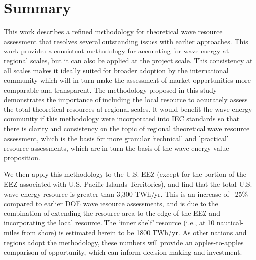 \section{Summary}
\label{sec:conclusion}

This work describes a refined methodology for theoretical wave resource assessment that resolves several outstanding issues with earlier approaches. This work provides a consistent methodology for accounting for wave energy at regional scales, but it can also be applied at the project scale. This consistency at all scales makes it ideally suited for broader adoption by the international community which will in turn make the assessment of market opportunities more comparable and transparent. The methodology proposed in this study demonstrates the importance of including the local resource to accurately assess the total theoretical resources at regional scales. It would benefit the wave energy community if this methodology were incorporated into IEC standards so that there is clarity and consistency on the topic of regional theoretical wave resource assessment, which is the basis for more granular `technical' and 'practical' resource assessments, which are in turn the basis of the wave energy value proposition.

We then apply this methodology to the U.S. EEZ (except for the portion of the EEZ associated with U.S. Pacific Islands Territories), and find that the total U.S. wave energy resource is greater than 3,300 TWh/yr.
This is an increase of ~25\% compared to earlier DOE wave resource assessments, and is due to the combination of extending the resource area to the edge of the EEZ and incorporating the local resource. The `inner shelf' resource (i.e., at 10 nautical-miles from shore) is estimated herein to be 1800 TWh/yr.  As other nations and regions adopt the methodology, these numbers will provide an apples-to-apples comparison of opportunity, which can inform decision making and investment.

